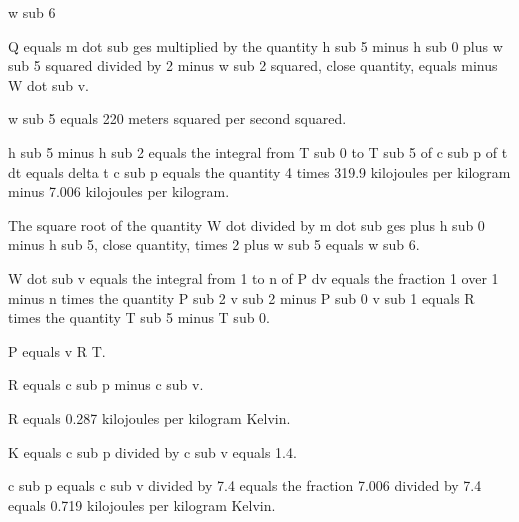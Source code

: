 w sub 6

Q equals m dot sub ges multiplied by the quantity h sub 5 minus h sub 0 plus w sub 5 squared divided by 2 minus w sub 2 squared, close quantity, equals minus W dot sub v.

w sub 5 equals 220 meters squared per second squared.

h sub 5 minus h sub 2 equals the integral from T sub 0 to T sub 5 of c sub p of t dt equals delta t c sub p equals the quantity 4 times 319.9 kilojoules per kilogram minus 7.006 kilojoules per kilogram.

The square root of the quantity W dot divided by m dot sub ges plus h sub 0 minus h sub 5, close quantity, times 2 plus w sub 5 equals w sub 6.

W dot sub v equals the integral from 1 to n of P dv equals the fraction 1 over 1 minus n times the quantity P sub 2 v sub 2 minus P sub 0 v sub 1 equals R times the quantity T sub 5 minus T sub 0.

P equals v R T.

R equals c sub p minus c sub v.

R equals 0.287 kilojoules per kilogram Kelvin.

K equals c sub p divided by c sub v equals 1.4.

c sub p equals c sub v divided by 7.4 equals the fraction 7.006 divided by 7.4 equals 0.719 kilojoules per kilogram Kelvin.